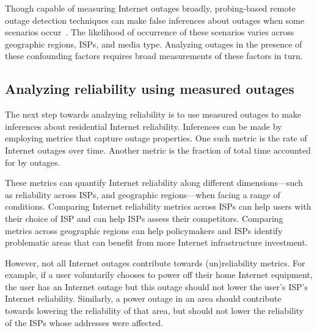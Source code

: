 

Though capable of measuring Internet outages broadly, probing-based remote outage detection techniques can
make false inferences about outages when some scenarios
occur~\cite{timeouts, addrchange-reasons}. The likelihood of
occurrence of these scenarios varies across geographic regions,
ISPs, and media type. Analyzing outages in the presence of these
confounding factors requires broad measurements of these factors in turn.

\subsection{Analyzing reliability using measured outages}

The next step towards analzying reliability is to use measured outages
to make inferences about residential Internet reliability. Inferences
can be made by employing metrics that capture outage properties. One such
metric is the rate of Internet outages over time. Another
metric is the fraction of total time accounted for by outages. 

These metrics can quantify Internet reliability along different
dimensions---such as reliability across ISPs, and geographic
regions---when facing a range of conditions. Comparing Internet
reliability metrics across ISPs can help users with their choice of ISP and
can help ISPs assess their competitors. Comparing metrics across geographic
regions can help policymakers and ISPs identify problematic areas that
can benefit from more Internet infrastructure investment.

However, not all Internet outages contribute towards
(un)reliability metrics. For example, if a user voluntarily chooses to power
off their home Internet equipment, the user has an Internet outage but
this outage should not lower the user's ISP's Internet reliability. Similarly, a power
outage in an area should contribute towards lowering the reliability
of that area, but should not lower the reliability of the
ISPs whose addresses were affected. 

